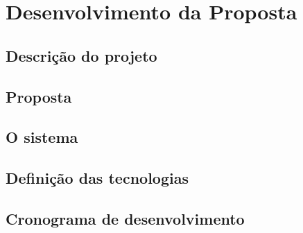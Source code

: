 

\chapter[Desenvolvimento da Proposta]{Desenvolvimento da Proposta}


\section{Descrição do projeto}


\section{Proposta}



\section{O sistema}

\section{Definição das tecnologias}

\section{Cronograma de desenvolvimento}




